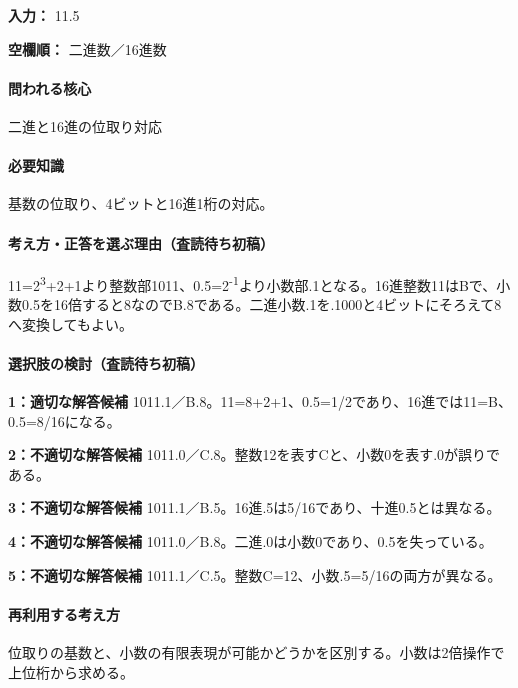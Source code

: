 \noindent\textbf{入力：} 11.5\par

\noindent\textbf{空欄順：} 二進数／16進数\par

\paragraph{問われる核心} 二進と16進の位取り対応

\paragraph{必要知識} 基数の位取り、4ビットと16進1桁の対応。

\paragraph{考え方・正答を選ぶ理由（査読待ち初稿）} 11=\allowbreak{}2\textsuperscript{3}+2+1より整数部1011、0.5=\allowbreak{}2\textsuperscript{-1}より小数部.1となる。16進整数11はBで、小数0.5を16倍すると8なのでB.8である。二進小数.1を.1000と4ビットにそろえて8へ変換してもよい。

\paragraph{選択肢の検討（査読待ち初稿）}\mbox{}\par

\noindent\textbf{1：適切な解答候補} 1011.1／B.8。11=\allowbreak{}8+2+1、0.5=\allowbreak{}1/2であり、16進では11=\allowbreak{}B、0.5=\allowbreak{}8/16になる。\par

\noindent\textbf{2：不適切な解答候補} 1011.0／C.8。整数12を表すCと、小数0を表す.0が誤りである。\par

\noindent\textbf{3：不適切な解答候補} 1011.1／B.5。16進.5は5/16であり、十進0.5とは異なる。\par

\noindent\textbf{4：不適切な解答候補} 1011.0／B.8。二進.0は小数0であり、0.5を失っている。\par

\noindent\textbf{5：不適切な解答候補} 1011.1／C.5。整数C=\allowbreak{}12、小数.5=\allowbreak{}5/16の両方が異なる。\par

\paragraph{再利用する考え方} 位取りの基数と、小数の有限表現が可能かどうかを区別する。小数は2倍操作で上位桁から求める。

